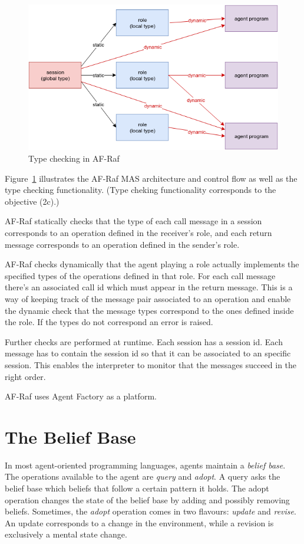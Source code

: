 \documentclass[a4paper,12pt,oneside,fleqn]{book} %
\begin{document}
\begin{figure}\footnotesize %
\includegraphics{typechecking.png}
\caption{Type checking in AF-Raf}
\label{fig:typechecking}
\end{figure} %

Figure~\ref{fig:typechecking} illustrates the AF-Raf MAS architecture and
control flow as well as the type checking functionality. (Type cheking
functionality corresponds to the objective (2c).)

AF-Raf statically checks that the type of each call message in a session
corresponds to an operation defined in the receiver's role, and each return
message corresponds to an operation defined in the sender's role.

AF-Raf checks dynamically that the agent playing a role actually implements
the specified types of the operations defined in that role.  For each call
message there's an associated call id which must appear in the return
message. This is a way of keeping track of the message pair associated to
an operation and enable the dynamic check that the message types correspond
to the ones defined inside the role. If the types do not correspond an
error is raised.

Further checks are performed at runtime. Each session has a session id.
Each message has to contain the session id so that it can be associated to
an specific session. This enables the interpreter to monitor that the
messages succeed in the right order.

AF-Raf uses Agent Factory as a platform. 
\section{The Belief Base} %

In most agent-oriented programming languages, agents maintain a
\emph{belief base}.  The operations available to the agent are
\textit{query} and \textit{adopt}.  A query asks the belief base which
beliefs that follow a certain pattern it holds.  The adopt operation
changes the state of the belief base by adding and possibly removing
beliefs.  Sometimes, the {\it adopt\/} operation comes in two flavours:
{\it update\/} and {\it revise}.  An update corresponds to a change in the
environment, while a revision is exclusively a mental state change.
\end{document}
